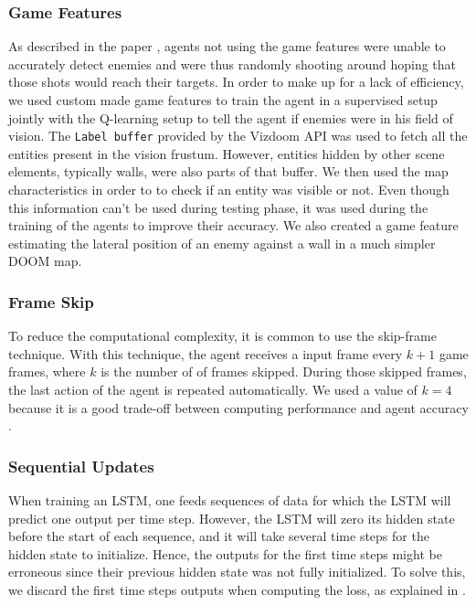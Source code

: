\documentclass[letterpaper]{article}
\begin{document}
\subsubsection{Game Features} As described in the paper \citep{Lample2016},
agents not using the game features were unable to accurately detect enemies and
were thus randomly shooting around hoping that those shots would reach their
targets. In order to make up for a lack of efficiency, we used custom made game
features to train the agent in a supervised setup jointly with the Q-learning
setup to tell the agent if enemies were in his field of vision.  The
\texttt{Label buffer} provided by the Vizdoom API  was used to fetch all the
entities present in the vision frustum. However, entities hidden by other scene
elements, typically walls, were also parts of that buffer. We then used the map
characteristics in order to to check if an entity was visible or not. Even
though this information can't be used during testing phase, it was used during
the training of the agents to improve their accuracy. We also created a game
feature estimating the lateral position of an enemy against a wall in a much
simpler DOOM map.

\subsubsection{Frame Skip}
To reduce the computational complexity, it is common to use the skip-frame
technique. With this technique, the agent receives a input frame every $k + 1$
game frames, where $k$ is the number of of frames skipped. During those
skipped frames, the last action of the agent is repeated automatically.
We used a value of $k=4$ because it is a good trade-off between
computing performance and agent accuracy \citep{Kempka2016}.


\subsubsection{Sequential Updates}
When training an LSTM, one feeds sequences of data for which the LSTM will
predict one output per time step. However, the LSTM will zero its hidden state
before the start of each sequence, and it will take several time steps for the
hidden state to initialize. Hence, the outputs for the first time steps might
be erroneous since their previous hidden state was not fully initialized.
To solve this, we discard the first time steps outputs when computing the loss,
as explained in \citep{Lample2016}.
\end{document}
